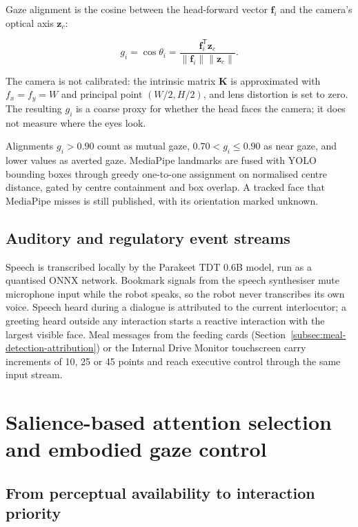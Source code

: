 Gaze alignment is the cosine between the head-forward vector $\mathbf{f}_i$ and the camera's optical axis $\mathbf{z}_c$:

\begin{equation}
    g_i=\cos\theta_i=
    \frac{\mathbf{f}_i^{\mathsf T}\mathbf{z}_c}
    {\lVert\mathbf{f}_i\rVert\lVert\mathbf{z}_c\rVert}.
    \label{eq:gaze-alignment}
\end{equation}

The camera is not calibrated: the intrinsic matrix $\mathbf{K}$ is approximated with $f_x=f_y=W$ and principal point $(W/2,H/2)$, and lens distortion is set to zero. The resulting $g_i$ is a coarse proxy for whether the head faces the camera; it does not measure where the eyes look.

Alignments $g_i > 0.90$ count as mutual gaze, $0.70 < g_i \leq 0.90$ as near gaze, and lower values as averted gaze. MediaPipe landmarks are fused with YOLO bounding boxes through greedy one-to-one assignment on normalised centre distance, gated by centre containment and box overlap. A tracked face that MediaPipe misses is still published, with its orientation marked unknown.

\subsection{Auditory and regulatory event streams}
\label{subsec:auditory-regulatory-streams}

Speech is transcribed locally by the Parakeet TDT 0.6B model, run as a quantised ONNX network. Bookmark signals from the speech synthesiser mute microphone input while the robot speaks, so the robot never transcribes its own voice. Speech heard during a dialogue is attributed to the current interlocutor; a greeting heard outside any interaction starts a reactive interaction with the largest visible face. Meal messages from the feeding cards (Section~\ref{subsec:meal-detection-attribution}) or the Internal Drive Monitor touchscreen carry increments of 10, 25 or 45 points and reach executive control through the same input stream.

\section{Salience-based attention selection and embodied gaze control}
\label{sec:salience-attention}

\subsection{From perceptual availability to interaction priority}
\label{subsec:interaction-priority}

